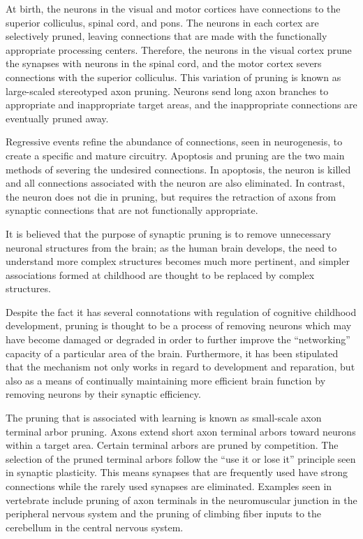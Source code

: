 \documentclass[]{book}
\begin{document}
At birth, the neurons in the visual and motor cortices have connections to the superior colliculus, spinal cord, and pons. The neurons in each cortex are selectively pruned, leaving connections that are made with the functionally appropriate processing centers. Therefore, the neurons in the visual cortex prune the synapses with neurons in the spinal cord, and the motor cortex severs connections with the superior colliculus. This variation of pruning is known as large-scaled stereotyped axon pruning. Neurons send long axon branches to appropriate and inappropriate target areas, and the inappropriate connections are eventually pruned away.

Regressive events refine the abundance of connections, seen in neurogenesis, to create a specific and mature circuitry. Apoptosis and pruning are the two main methods of severing the undesired connections. In apoptosis, the neuron is killed and all connections associated with the neuron are also eliminated. In contrast, the neuron does not die in pruning, but requires the retraction of axons from synaptic connections that are not functionally appropriate.

It is believed that the purpose of synaptic pruning is to remove unnecessary neuronal structures from the brain; as the human brain develops, the need to understand more complex structures becomes much more pertinent, and simpler associations formed at childhood are thought to be replaced by complex structures.

Despite the fact it has several connotations with regulation of cognitive childhood development, pruning is thought to be a process of removing neurons which may have become damaged or degraded in order to further improve the ``networking'' capacity of a particular area of the brain. Furthermore, it has been stipulated that the mechanism not only works in regard to development and reparation, but also as a means of continually maintaining more efficient brain function by removing neurons by their synaptic efficiency.

The pruning that is associated with learning is known as small-scale axon terminal arbor pruning. Axons extend short axon terminal arbors toward neurons within a target area. Certain terminal arbors are pruned by competition. The selection of the pruned terminal arbors follow the ``use it or lose it'' principle seen in synaptic plasticity. This means synapses that are frequently used have strong connections while the rarely used synapses are eliminated. Examples seen in vertebrate include pruning of axon terminals in the neuromuscular junction in the peripheral nervous system and the pruning of climbing fiber inputs to the cerebellum in the central nervous system.
\end{document}
